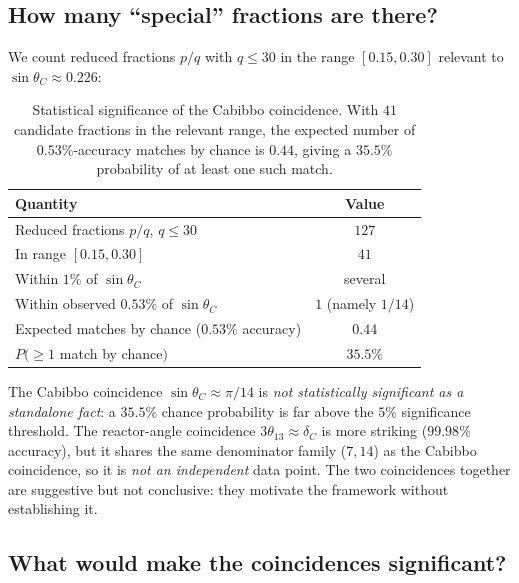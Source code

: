 \documentclass[11pt,a4paper]{article}
\newcommand{\dC}{\delta_C}
\theoremstyle{plain}
\theoremstyle{definition}
\theoremstyle{remark}
\begin{document}
\subsection{How many ``special'' fractions are there?}

We count reduced fractions $p/q$ with $q \le 30$ in the range
$[0.15, 0.30]$ relevant to $\sin\theta_C \approx 0.226$:

\begin{table}[h]
\centering
\small
\begin{tabular}{l c}
\toprule
Quantity & Value \\
\midrule
Reduced fractions $p/q$, $q \le 30$ & $127$ \\
In range $[0.15, 0.30]$ & $41$ \\
Within $1\%$ of $\sin\theta_C$ & several \\
Within observed $0.53\%$ of $\sin\theta_C$ & $1$ (namely $1/14$) \\
\midrule
Expected matches by chance ($0.53\%$ accuracy) & $0.44$ \\
$P(\ge 1$ match by chance$)$ & $35.5\%$ \\
\bottomrule
\end{tabular}
\caption{Statistical significance of the Cabibbo coincidence.  With
$41$ candidate fractions in the relevant range, the expected number
of $0.53\%$-accuracy matches by chance is $0.44$, giving a
$35.5\%$ probability of at least one such match.}
\label{tab:coincidence}
\end{table}

\begin{verdict}
The Cabibbo coincidence $\sin\theta_C \approx \pi/14$ is
\emph{not statistically significant as a standalone fact}: a
$35.5\%$ chance probability is far above the $5\%$ significance
threshold.  The reactor-angle coincidence $3\theta_{13} \approx \dC$
is more striking ($99.98\%$ accuracy), but it shares the same
denominator family ($7, 14$) as the Cabibbo coincidence, so it is
\emph{not an independent} data point.  The two coincidences together
are suggestive but not conclusive: they motivate the framework
without establishing it.
\end{verdict}

\subsection{What would make the coincidences significant?}
\end{document}
